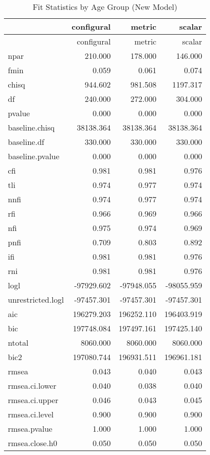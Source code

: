 \documentclass[
  letterpaper,
  DIV=11,
  numbers=noendperiod]{scrartcl}
\begin{document}
\begin{longtable}[]{@{}lrrr@{}}
\caption{Fit Statistics by Age Group (New Model)}\tabularnewline
\toprule\noalign{}
& configural & metric & scalar \\
\midrule\noalign{}
\endfirsthead
\toprule\noalign{}
& configural & metric & scalar \\
\midrule\noalign{}
\endhead
\bottomrule\noalign{}
\endlastfoot
npar & 210.000 & 178.000 & 146.000 \\
fmin & 0.059 & 0.061 & 0.074 \\
chisq & 944.602 & 981.508 & 1197.317 \\
df & 240.000 & 272.000 & 304.000 \\
pvalue & 0.000 & 0.000 & 0.000 \\
baseline.chisq & 38138.364 & 38138.364 & 38138.364 \\
baseline.df & 330.000 & 330.000 & 330.000 \\
baseline.pvalue & 0.000 & 0.000 & 0.000 \\
cfi & 0.981 & 0.981 & 0.976 \\
tli & 0.974 & 0.977 & 0.974 \\
nnfi & 0.974 & 0.977 & 0.974 \\
rfi & 0.966 & 0.969 & 0.966 \\
nfi & 0.975 & 0.974 & 0.969 \\
pnfi & 0.709 & 0.803 & 0.892 \\
ifi & 0.981 & 0.981 & 0.976 \\
rni & 0.981 & 0.981 & 0.976 \\
logl & -97929.602 & -97948.055 & -98055.959 \\
unrestricted.logl & -97457.301 & -97457.301 & -97457.301 \\
aic & 196279.203 & 196252.110 & 196403.919 \\
bic & 197748.084 & 197497.161 & 197425.140 \\
ntotal & 8060.000 & 8060.000 & 8060.000 \\
bic2 & 197080.744 & 196931.511 & 196961.181 \\
rmsea & 0.043 & 0.040 & 0.043 \\
rmsea.ci.lower & 0.040 & 0.038 & 0.040 \\
rmsea.ci.upper & 0.046 & 0.043 & 0.045 \\
rmsea.ci.level & 0.900 & 0.900 & 0.900 \\
rmsea.pvalue & 1.000 & 1.000 & 1.000 \\
rmsea.close.h0 & 0.050 & 0.050 & 0.050 \\

\end{longtable}
\end{document}
